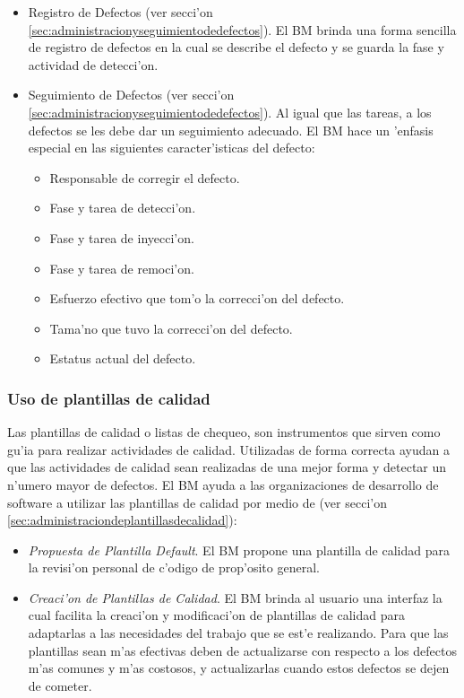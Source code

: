 \begin{itemize}
	\item Registro de Defectos (ver secci'on \ref{sec:administracionyseguimientodedefectos}). El BM brinda una forma sencilla de registro de defectos en la cual se describe el defecto y se guarda la fase y actividad de detecci'on. 
	\item	Seguimiento de Defectos (ver secci'on \ref{sec:administracionyseguimientodedefectos}). Al igual que las tareas, a los defectos se les debe dar un seguimiento adecuado. El BM hace un 'enfasis especial en las siguientes caracter'isticas del defecto:
	\begin{itemize}
		\item Responsable de corregir el defecto.
		\item Fase y tarea de detecci'on.
		\item Fase y tarea de inyecci'on.
		\item Fase y tarea de remoci'on.
		\item Esfuerzo efectivo que tom'o la correcci'on del defecto.
		\item Tama'no que tuvo la correcci'on del defecto.
		\item Estatus actual del defecto.
	\end{itemize}
\end{itemize}

\subsubsection{Uso de plantillas de calidad}
\label{sec:Usodeplantillasdecalidad}
\noindent
Las plantillas de calidad o listas de chequeo, son instrumentos que sirven como gu'ia para realizar actividades de calidad. Utilizadas de forma correcta ayudan a que las actividades de calidad sean realizadas de una mejor forma y detectar un n'umero mayor de defectos. El BM ayuda a las organizaciones de desarrollo de software a utilizar las plantillas de calidad por medio de (ver secci'on \ref{sec:administraciondeplantillasdecalidad}):

\begin{itemize}
	\item \emph{Propuesta de Plantilla Default}. El BM propone una plantilla de calidad para la revisi'on personal de c'odigo de prop'osito general.
	\item \emph{Creaci'on de Plantillas de Calidad}. El BM brinda al usuario una interfaz la cual facilita la creaci'on y modificaci'on de plantillas de calidad para adaptarlas a las necesidades del trabajo que se est'e realizando. Para que las plantillas sean m'as efectivas deben de actualizarse con respecto a los defectos m'as comunes y m'as costosos, y actualizarlas cuando estos defectos se dejen de cometer.
\end{itemize}

